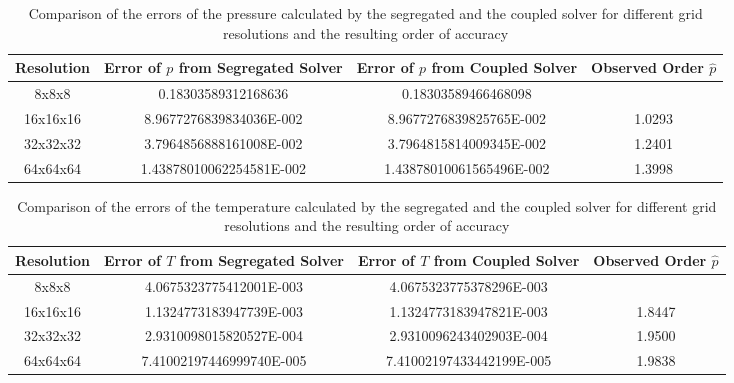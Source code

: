 \begin{table}[h!]\centering
{}
  \begin{tabular}{cccc}\toprule
    Resolution & Error of \(p\) from Segregated Solver & Error of \(p\) from Coupled Solver & Observed Order \(\hat{p}\) \\
    \midrule
    \rowcolor{black!20} 8x8x8    & 0.18303589312168636      &  0.18303589466468098      &        \\%
    \rowcolor{black!00} 16x16x16 & 8.9677276839834036E-002  &  8.9677276839825765E-002  & 1.0293 \\%
    \rowcolor{black!20} 32x32x32 & 3.7964856888161008E-002  &  3.7964815814009345E-002  & 1.2401 \\%
    \rowcolor{black!00} 64x64x64 & 1.43878010062254581E-002 &  1.43878010061565496E-002 & 1.3998 \\%
  \end{tabular}
  \caption{Comparison of the errors of the pressure calculated by the segregated and the coupled solver for different grid resolutions and the resulting order of accuracy}
\end{table}

\begin{table}[h!]\centering
{}
  \begin{tabular}{cccc}\toprule
    Resolution & Error of \(T\) from Segregated Solver & Error of \(T\) from Coupled Solver & Observed Order \(\hat{p}\) \\
    \midrule
    \rowcolor{black!20} 8x8x8    & 4.0675323775412001E-003   & 4.0675323775378296E-003  &   \\%
    \rowcolor{black!00} 16x16x16 & 1.1324773183947739E-003   & 1.1324773183947821E-003  & 1.8447 \\%
    \rowcolor{black!20} 32x32x32 & 2.9310098015820527E-004   & 2.9310096243402903E-004  & 1.9500 \\%
    \rowcolor{black!00} 64x64x64 & 7.41002197446999740E-005  & 7.41002197433442199E-005 & 1.9838 \\%
  \end{tabular}
  \caption{Comparison of the errors of the temperature calculated by the segregated and the coupled solver for different grid resolutions and the resulting order of accuracy}
\end{table}

